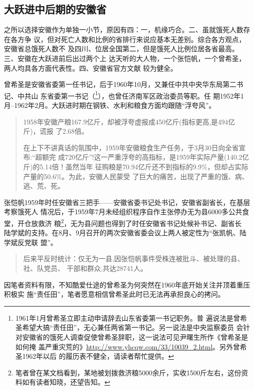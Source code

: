 \subsection{大跃进中后期的安徽省}

之所以选择安徽作为单独一小节，原因有四：一，机缘巧合。二、虽就饿死人数存在各方争
议，但对死亡人数和比例的省排行来说应基本无差别。综合各方观点，安徽省总饿死人数不
及四川、位居全国第二，但是饿死人比例位居各省最高。三、安徽在大跃进前后出过两个上
达天听的大人物，一个张恺帆，一个曾希圣，两人均具各方面代表性。四、安徽省官方文献
较为健全。

曾希圣是安徽省委第一任书记，后于1960年10月，又兼任中共中央华东局第二书记、中共山
东省委第一书记（\footnote{1961年1月曾希圣立即主动申请辞去山东省委第一书记职务。普
  遍说法是曾希圣希望大搞``责任田''，无心兼任两省第一书记。另一说法是中央监察委员
  会针对安徽省的饿死人调查促使曾希圣辞职，这一说法可见尹曙生所作《曾希圣是如何掩
  盖严重灾荒的》\url{http://www.yhcqw.com/33/10039_2.html}。另外曾希圣1962年以后
  的履历表不健全，请读者帮忙提供。}），也曾任济南军区政治委员等职。任
期1952年1月--1962年2月。大跃进时期在钢铁、水利和粮食方面均跟随``浮夸风''。
\begin{quotation}
  1958年安徽产粮167.9亿斤，却被浮夸虚报成450亿斤(指标更高,是494亿斤)，谎报
  了2.68倍。\cite{zhangfandang}

  在上下不讲真话的氛围中，1959年安徽粮食生产任务，于3月30日向全省宣布:“超额完
  成720亿斤”!这一严重浮夸的高指标，是1959年实际产量(140.2亿斤)的5.14倍！虽然当年
  征购粮是70.94亿斤还不到指标的9.9\%，但却占实际产量的50.6\%。为此，安徽人民蒙受
  了巨大的痛苦，出现了严重的饿、病、逃、荒、死。\cite{zhang1959}
\end{quotation}

张恺帆1959年时任安徽省三把手——安徽省委书记处书记，安徽省副省长，在基层考察饿死人
情况后，于1959年7月未经组织程序自作主张停办无为县6000多公共食堂，开仓放救济
粮\footnote{笔者曾在某文档看到，某地被划拨救济粮5000余斤，实收1500斤左右，这份资
  料如有读者知晓，还望告知。}，无为县问题也得到了时任安徽省书记处候补书记、副省长
陆学斌的支持。在8月、9月召开的两次安徽省委会议上两人被定性为``张凯帆、陆学斌反党联
盟''。
\begin{quotation}
  后来平反时统计：仅无为一县,因张恺帆事件受株连被批斗、被处理的县、社、队党员、
  干部和群众,共达28741人。\cite{zhang1959}
\end{quotation}

因笔者资料有限，不知酷爱仕途的曾希圣为何突然在1960年底开始关注并顶着重压积极实
施``责任田''，笔者愿意相信曾希圣此时已无法再承担良心的拷问。


